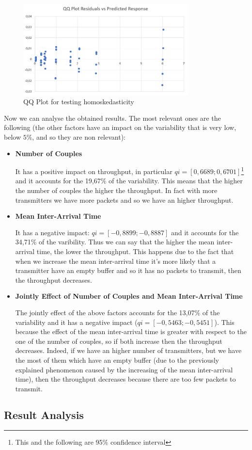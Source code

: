 \begin{figure}[H]
	\centering
	\includegraphics[width=0.8\textwidth]{img/homoskedasticity_2kr_throughput.png}
	\caption{QQ Plot for testing homoskedasticity}
	\label {img: homoskedasticity_throughput}
\end{figure}

\noindent Now we can analyse the obtained results. The most relevant ones are the following (the other factors have an impact on the variability that is very low, below $5\%$, and so they are non relevant):

\begin{itemize}
	\item \textbf{Number of Couples}
	
	\noindent It has a positive impact on throughput, in particular $qi = [0,6689; 0,6701]$\footnote{This and the following are 95\% confidence interval} and it accounts for the 19,67\% of the variability. This means that the higher the number of couples the higher the throughput. In fact with more transmitters we have more packets and so we have an higher throughput.
	 
	\item \textbf{Mean Inter-Arrival Time}
	
	\noindent It has a negative impact: $qi = [-0,8899; -0,8887]$ and it accounts for the 34,71\% of the varibility. Thus we can say that the higher the mean inter-arrival time, the lower the throughput. This happens due to the fact that when we increase the mean inter-arrival time it's more likely that a transmitter have an empty buffer and so it has no packets to transmit, then the throughput decreases. 
	
	\item \textbf{Jointly Effect of Number of Couples and Mean Inter-Arrival Time}
	
	\noindent The jointly effect of the above factors accounts for the 13,07\% of the variability and it has a negative impact ($qi = [-0,5463; -0,5451]$). This because the effect of the mean inter-arrival time is greater with respect to the one of the number of couples, so if both increase then the throughput decreases. Indeed, if we have an higher number of transmitters, but we have the most of them which have an empty buffer (due to the previously explained phenomenon caused by the increasing of the mean inter-arrival time), then the throughput decreases because there are too few packets to transmit.
\end{itemize}

\subsection{Result Analysis}